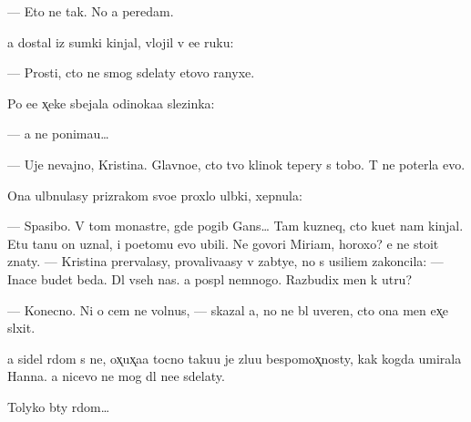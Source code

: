 \documentclass[10pt]{book}
\begin{document}
— Eto ne tak. No {\y}a peredam.

{\Y}a dostal iz sumki kinjal, vlojil v {\y}e{\y}e ruku:

— Prosti, cto ne smog sdelaty etovo ranyxe.

Po {\y}e{\y}e x̨eke sbejala odinoka{\y}a slezinka:

— {\Y}a ne ponima{\y}u…

— Uje nevajno, Kristina. Glavno{\y}e, cto tvo{\y} klinok tepery s tobo{\y}. T{\yi} ne poter{\ia}la {\y}evo.

Ona ul{\yi}bnulasy prizrakom svo{\y}e{\y} proxlo{\y} ul{\yi}bki, xepnula:

— Spasibo. V tom monast{\yi}re, gde pogib Gans… Tam kuzneq, cto ku{\y}et nam kinjal{\yi}. Etu ta{\y}nu on uznal, i poetomu {\y}evo ubili. Ne govori Miriam, horoxo? {\Y}e{\y} ne sto{\y}it znaty. — Kristina prervalasy, provaliva{\y}asy v zab{\yi}tye, no s usili{\y}em zakoncila: — Inace budet beda. Dl{\ia} vseh nas. {\Y}a pospl{\iu} nemnogo. Razbudix men{\ia} k utru?

— Konecno. Ni o cem ne volnu{\y}s{\ia}, — skazal {\y}a, no ne b{\yi}l uveren, cto ona men{\ia} {\y}ex̨e sl{\yi}xit.

{\Y}a sidel r{\ia}dom s ne{\y}, ox̨ux̨a{\y}a tocno taku{\y}u je zlu{\y}u bespomox̨nosty, kak kogda umirala Hanna. {\Y}a nicevo ne mog dl{\ia} ne{\y}e sdelaty.

Tolyko b{\yi}ty r{\ia}dom…
\end{document}
